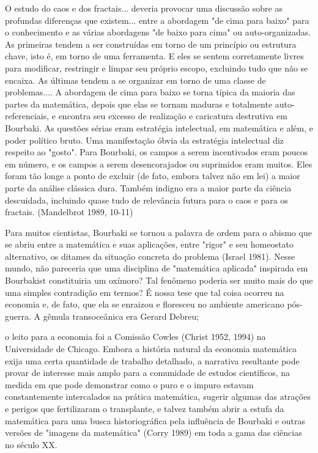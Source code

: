 \documentclass[12pt]{article}
\begin{document}
O estudo do caos e dos fractais... deveria provocar uma discussão sobre as profundas diferenças que existem... entre a abordagem "de cima para baixo" para o conhecimento e as várias abordagens "de baixo para cima" ou auto-organizadas. As primeiras tendem a ser construídas em torno de um princípio ou estrutura chave, isto é, em torno de uma ferramenta. E eles se sentem corretamente livres para modificar, restringir e limpar seu próprio escopo, excluindo tudo que não se encaixa. As últimas tendem a se organizar em torno de uma classe de problemas.... A abordagem de cima para baixo se torna típica da maioria das partes da matemática, depois que elas se tornam maduras e totalmente auto-referenciais, e encontra seu excesso de realização e caricatura destrutiva em Bourbaki. As questões sérias eram estratégia intelectual, em matemática e além, e poder político bruto. Uma manifestação óbvia da estratégia intelectual diz respeito ao "gosto". Para Bourbaki, os campos a serem incentivados eram poucos em número, e os campos a serem desencorajados ou suprimidos eram muitos. Eles foram tão longe a ponto de excluir (de fato, embora talvez não em lei) a maior parte da análise clássica dura. Também indigno era a maior parte da ciência descuidada, incluindo quase tudo de relevância futura para o caos e para os fractais. (Mandelbrot 1989, 10-11)

Para muitos cientistas, Bourbaki se tornou a palavra de ordem para o abismo que se abriu entre a matemática e suas aplicações, entre "rigor" e seu homeostato alternativo, os ditames da situação concreta do problema (Israel 1981). Nesse mundo, não pareceria que uma disciplina de "matemática aplicada" inspirada em Bourbakist constituiria um oxímoro? Tal fenômeno poderia ser muito mais do que uma simples contradição em termos? É nossa tese que tal coisa ocorreu na economia e, de fato, que ela se enraizou e floresceu no ambiente americano pós-guerra. A gêmula transoceânica era Gerard Debreu;

o leito para a economia foi a Comissão Cowles (Christ 1952, 1994) na Universidade de Chicago. Embora a história natural da economia matemática exija uma certa quantidade de trabalho detalhado, a narrativa resultante pode provar de interesse mais amplo para a comunidade de estudos científicos, na medida em que pode demonstrar como o puro e o impuro estavam constantemente intercalados na prática matemática, sugerir algumas das atrações e perigos que fertilizaram o transplante, e talvez também abrir a estufa da matemática para uma busca historiográfica pela influência de Bourbaki e outras versões de "imagens da matemática" (Corry 1989) em toda a gama das ciências no século XX.
\end{document}
